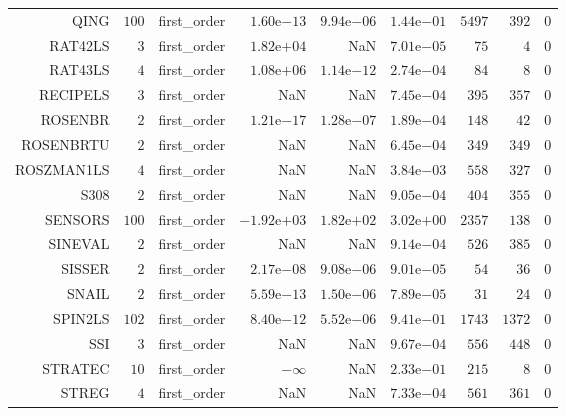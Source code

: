 \begin{longtable}{rrrrrrrrr}
QING & \(   100\) & first\_order & \( 1.60\)e\(-13\) & \( 9.94\)e\(-06\) & \( 1.44\)e\(-01\) & \(  5497\) & \(   392\) & \(     0\) \\
RAT42LS & \(     3\) & first\_order & \( 1.82\)e\(+04\) &       NaN & \( 7.01\)e\(-05\) & \(    75\) & \(     4\) & \(     0\) \\
RAT43LS & \(     4\) & first\_order & \( 1.08\)e\(+06\) & \( 1.14\)e\(-12\) & \( 2.74\)e\(-04\) & \(    84\) & \(     8\) & \(     0\) \\
RECIPELS & \(     3\) & first\_order &       NaN &       NaN & \( 7.45\)e\(-04\) & \(   395\) & \(   357\) & \(     0\) \\
ROSENBR & \(     2\) & first\_order & \( 1.21\)e\(-17\) & \( 1.28\)e\(-07\) & \( 1.89\)e\(-04\) & \(   148\) & \(    42\) & \(     0\) \\
ROSENBRTU & \(     2\) & first\_order &       NaN &       NaN & \( 6.45\)e\(-04\) & \(   349\) & \(   349\) & \(     0\) \\
ROSZMAN1LS & \(     4\) & first\_order &       NaN &       NaN & \( 3.84\)e\(-03\) & \(   558\) & \(   327\) & \(     0\) \\
S308 & \(     2\) & first\_order &       NaN &       NaN & \( 9.05\)e\(-04\) & \(   404\) & \(   355\) & \(     0\) \\
SENSORS & \(   100\) & first\_order & \(-1.92\)e\(+03\) & \( 1.82\)e\(+02\) & \( 3.02\)e\(+00\) & \(  2357\) & \(   138\) & \(     0\) \\
SINEVAL & \(     2\) & first\_order &       NaN &       NaN & \( 9.14\)e\(-04\) & \(   526\) & \(   385\) & \(     0\) \\
SISSER & \(     2\) & first\_order & \( 2.17\)e\(-08\) & \( 9.08\)e\(-06\) & \( 9.01\)e\(-05\) & \(    54\) & \(    36\) & \(     0\) \\
SNAIL & \(     2\) & first\_order & \( 5.59\)e\(-13\) & \( 1.50\)e\(-06\) & \( 7.89\)e\(-05\) & \(    31\) & \(    24\) & \(     0\) \\
SPIN2LS & \(   102\) & first\_order & \( 8.40\)e\(-12\) & \( 5.52\)e\(-06\) & \( 9.41\)e\(-01\) & \(  1743\) & \(  1372\) & \(     0\) \\
SSI & \(     3\) & first\_order &       NaN &       NaN & \( 9.67\)e\(-04\) & \(   556\) & \(   448\) & \(     0\) \\
STRATEC & \(    10\) & first\_order & \(-\infty\) &       NaN & \( 2.33\)e\(-01\) & \(   215\) & \(     8\) & \(     0\) \\
STREG & \(     4\) & first\_order &       NaN &       NaN & \( 7.33\)e\(-04\) & \(   561\) & \(   361\) & \(     0\) \\

\end{longtable}
